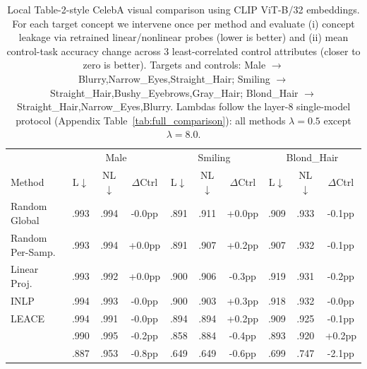 \begin{table}[t]
\centering
\caption{Local Table-2-style CelebA visual comparison using CLIP ViT-B/32 embeddings. For each target concept we intervene once per method and evaluate (i) concept leakage via retrained linear/nonlinear probes (lower is better) and (ii) mean control-task accuracy change across 3 least-correlated control attributes (closer to zero is better). Targets and controls: Male $\rightarrow$ Blurry,Narrow\_Eyes,Straight\_Hair; Smiling $\rightarrow$ Straight\_Hair,Bushy\_Eyebrows,Gray\_Hair; Blond\_Hair $\rightarrow$ Straight\_Hair,Narrow\_Eyes,Blurry. Lambdas follow the layer-8 single-model protocol (Appendix Table~\ref{tab:full_comparison}): all methods $\lambda{=}0.5$ except \TanGCE{} $\lambda{=}8.0$.}
\label{tab:local_celeba_visual_table2}
\small
\setlength{\tabcolsep}{4pt}
\begin{tabular}{l|ccc|ccc|ccc}
\toprule
 & \multicolumn{3}{c|}{Male} & \multicolumn{3}{c|}{Smiling} & \multicolumn{3}{c}{Blond\_Hair} \\
Method & L$\downarrow$ & NL$\downarrow$ & $\Delta$Ctrl & L$\downarrow$ & NL$\downarrow$ & $\Delta$Ctrl & L$\downarrow$ & NL$\downarrow$ & $\Delta$Ctrl \\
\midrule
Random Global & .993 & .994 & -0.0pp & .891 & .911 & +0.0pp & .909 & .933 & -0.1pp \\
Random Per-Samp. & .993 & .994 & +0.0pp & .891 & .907 & +0.2pp & .907 & .932 & -0.1pp \\
Linear Proj. & .993 & .992 & +0.0pp & .900 & .906 & -0.3pp & .919 & .931 & -0.2pp \\
INLP & .994 & .993 & -0.0pp & .900 & .903 & +0.3pp & .918 & .932 & -0.0pp \\
LEACE & .994 & .991 & -0.0pp & .894 & .894 & +0.2pp & .909 & .925 & -0.1pp \\
\AmbGCE{} & .990 & .995 & -0.2pp & .858 & .884 & -0.4pp & .893 & .920 & +0.2pp \\
\TanGCE{} & .887 & .953 & -0.8pp & .649 & .649 & -0.6pp & .699 & .747 & -2.1pp \\
\bottomrule
\end{tabular}
\end{table}
